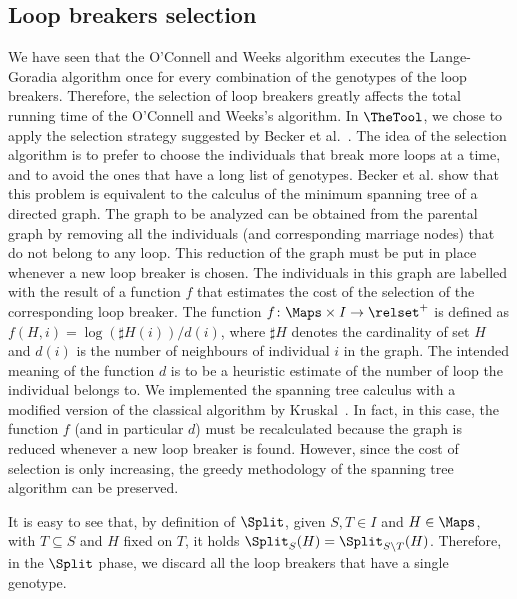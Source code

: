 \subsection{Loop breakers selection}
\label{sec:loop-break-select}
We have seen that the O'Connell and Weeks algorithm executes the Lange-Goradia
algorithm once for every combination of the genotypes of the loop
breakers. Therefore, the selection of loop breakers greatly affects the total
running time of the O'Connell and Weeks's algorithm. In {$\TheTool$}, we chose
to apply the selection strategy suggested by Becker et
al.~\cite{loopBecker}. The idea of the selection algorithm is to prefer to
choose the individuals that break more loops at a time, and to avoid the ones
that have a long list of genotypes. Becker et al. show that this problem is
equivalent to the calculus of the minimum spanning tree of a directed graph. The
graph to be analyzed can be obtained from the parental graph by removing all the
individuals (and corresponding marriage nodes) that do not belong to any
loop. This reduction of the graph must be put in place whenever a new loop
breaker is chosen.  The individuals in this graph are labelled with the result
of a function $f$ that estimates the cost of the selection of the corresponding
loop breaker. The function $f\colon \Maps \times I \to \relset^{+}$ is defined
as $f(H,i) = \log (\sharp H(i)) / d(i)$, where $\sharp H$ denotes the
cardinality of set $H$ and $d(i)$ is the number of neighbours of individual $i$
in the graph. The intended meaning of the function $d$ is to be a heuristic
estimate of the number of loop the individual belongs to. We implemented the
spanning tree calculus with a modified version of the classical algorithm by
Kruskal~\cite{kruskal}. In fact, in this case, the function $f$ (and in
particular $d$) must be recalculated because the graph is reduced whenever a new
loop breaker is found. However, since the cost of selection is only increasing,
the greedy methodology of the spanning tree algorithm can be preserved.

It is easy to see that, by definition of $\Split$, given $S,T \in I$ and $H \in
\Maps$, with $T \subseteq S$ and $H$ fixed on $T$, it holds $\Split_S (H) =
\Split_{S\backslash T}(H)$. Therefore, in the $\Split$ phase, we discard all
the loop breakers that have a single genotype. 

